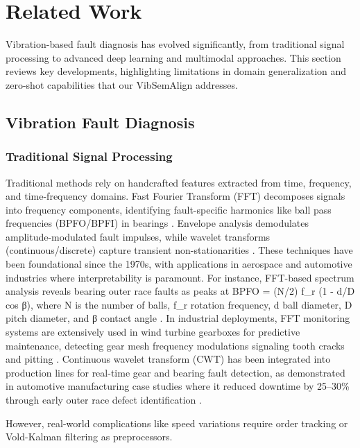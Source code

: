 \section{Related Work}

Vibration-based fault diagnosis has evolved significantly, from traditional signal processing to advanced deep learning and multimodal approaches. This section reviews key developments, highlighting limitations in domain generalization and zero-shot capabilities that our VibSemAlign addresses.

\subsection{Vibration Fault Diagnosis}
\subsubsection{Traditional Signal Processing}
Traditional methods rely on handcrafted features extracted from time, frequency, and time-frequency domains. Fast Fourier Transform (FFT) decomposes signals into frequency components, identifying fault-specific harmonics like ball pass frequencies (BPFO/BPFI) in bearings \cite{randall2011vibration}. Envelope analysis demodulates amplitude-modulated fault impulses, while wavelet transforms (continuous/discrete) capture transient non-stationarities \cite{lei2018review}. These techniques have been foundational since the 1970s, with applications in aerospace and automotive industries where interpretability is paramount. For instance, FFT-based spectrum analysis reveals bearing outer race faults as peaks at BPFO = (N/2) f_r (1 - d/D cos β), where N is the number of balls, f_r rotation frequency, d ball diameter, D pitch diameter, and β contact angle \cite{randall2011vibration}. In industrial deployments, FFT monitoring systems are extensively used in wind turbine gearboxes for predictive maintenance, detecting gear mesh frequency modulations signaling tooth cracks and pitting \cite{randall2011vibration}. Continuous wavelet transform (CWT) has been integrated into production lines for real-time gear and bearing fault detection, as demonstrated in automotive manufacturing case studies where it reduced downtime by 25--30\% through early outer race defect identification \cite{lei2018review}.

However, real-world complications like speed variations require order tracking or Vold-Kalman filtering as preprocessors.

